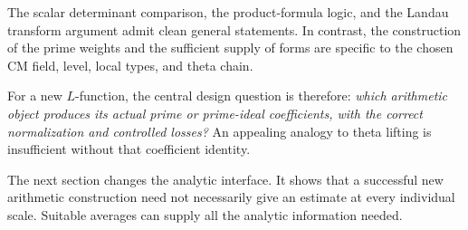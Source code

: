 The scalar determinant comparison, the product-formula logic, and the
Landau transform argument admit clean general statements. In contrast,
the construction of the prime weights and the sufficient supply of
forms are specific to the chosen CM field, level, local types, and
theta chain.

For a new $L$-function, the central design question is therefore:
\emph{which arithmetic object produces its actual prime or prime-ideal
coefficients, with the correct normalization and controlled losses?}
An appealing analogy to theta lifting is insufficient without that
coefficient identity.

The next section changes the analytic interface. It shows that a
successful new arithmetic construction need not necessarily give an
estimate at every individual scale. Suitable averages can supply all
the analytic information needed.
